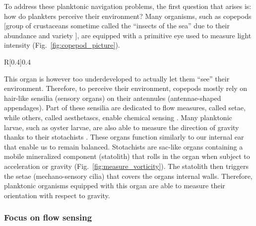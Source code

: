 To address these planktonic navigation problems, the first question that arises is: how do plankters perceive their environment?
Many organisms, such as copepods [group of crustaceans sometime called the ``insects of the sea'' due to their abundance and variety \citep{schminke2007entomology}], are equipped with a primitive eye used to measure light intensity (Fig.~\ref{fig:copepod_picture}).
\begin{wrapfigure}[15]{R}[0.4\width]{0.4\textwidth}
	\vspace{0pt}
	\centering
	\def\svgwidth{0.35\textwidth}
	
	\captionsetup{width=0.35\textwidth}
  	\caption[Annotated picture of copepod]{
  		Annotated picture of copepod (Female adult \textit{Acartia Clausi}). 
  		Original picture by Minami Himemiya \ccbysa  ~ v3.0.
  	}
  	\label{fig:copepod_picture}
\end{wrapfigure}
This organ is however too underdeveloped to actually let them ``see'' their environment.
Therefore, to perceive their environment, copepods mostly rely on hair-like sensilia (sensory organs) on their antennules (antennae-shaped appendages).
Part of these sensilia are dedicated to flow measures, called setae, while others, called aesthetascs, enable chemical sensing \citep{heuschele2014chemical}.
Many planktonic larvae, such as oyster larvae, are also able to measure the direction of gravity thanks to their stotachists \citep{fuchs2015hydrodynamic}.
These organs function similarly to our internal ear that enable us to remain balanced.
Stotachists are sac-like organs containing a mobile mineralized component (statolith) that rolls in the organ when subject to acceleration or gravity (Fig.~\ref{fig:measure_vorticity}).
The statolith then triggers the setae (mechano-sensory cilia) that covers the organs internal walls.
Therefore, planktonic organisms equipped with this organ are able to measure their orientation with respect to gravity.

\subsubsection{Focus on flow sensing}\label{sec:intro_flow_sensing}

